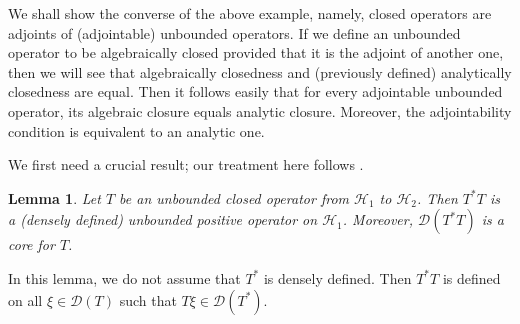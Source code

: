 \documentclass[12pt,a4paper,notitlepage]{article}
\theoremstyle{definition}
\theoremstyle{plain}
\newtheorem{lm}[df]{Lemma}
\newcommand{\mc}{\mathcal}
\newcommand{\Dom}{\scr D}
\newcommand{\scr}{\mathscr}
\numberwithin{equation}{section}
\begin{document}
We shall show the converse of the above example, namely, closed operators are adjoints of (adjointable) unbounded operators. If we define an unbounded operator to be algebraically closed provided that it is the adjoint of another one, then we will see that algebraically closedness and (previously defined) analytically closedness are equal. Then it follows easily that for every adjointable unbounded operator, its algebraic closure equals analytic closure. Moreover, the adjointability condition is equivalent to an analytic one.


We first need a crucial result; our treatment here follows \cite[Rem. 2.7.7]{Kad}.

\begin{lm}\label{lb16}
Let $T$ be an unbounded closed operator from $\mc H_1$ to $\mc H_2$. Then $T^*T$ is a (densely defined) unbounded positive operator on $\mc H_1$. Moreover, $\Dom(T^*T)$ is a core for $T$.
\end{lm}


In this lemma, we do not assume that $T^*$ is densely defined. Then $T^*T$ is defined on all $\xi\in\Dom(T)$ such that $T\xi\in\Dom(T^*)$.
\end{document}
